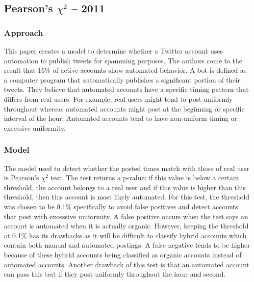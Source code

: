 \documentclass[11pt, oneside]{article}   	%
\begin{document}
\subsection*{Pearson's $\chi^2$ -- 2011}

\subsubsection*{Approach}

\quad This paper creates a model to determine whether a Twitter account uses automation to publish tweets for spamming purposes. 
The authors come to the result that 16\% of active accounts show automated behavior.
A bot is defined as a computer program that automatically publishes a significant portion of their tweets.
They believe that automated accounts have a specific timing pattern that differs from real users.
For example, real users might tend to post uniformly throughout whereas automated accounts might post at the beginning or specific interval of the hour.
Automated accounts tend to have non-uniform timing or excessive uniformity.

\subsubsection*{Model}

\quad The model used to detect whether the posted times match with those of real user is Pearson's $\chi^2$ test.
The test returns a p-value; if this value is below a certain threshold, the account belongs to a real user and if this value is higher than this threshold, then this account is most likely automated.
For this test, the threshold was chosen to be 0.1\% specifically to avoid false positives and detect accounts that post with excessive uniformity.
A false positive occurs when the test says an account is automated when it is actually organic.
However, keeping the threshold at 0.1\% has its drawbacks as it will be difficult to classify hybrid accounts which contain both manual and automated postings.
A false negative tends to be higher because of these hybrid accounts being classified as organic accounts instead of automated accounts.
Another drawback of this test is that an automated account can pass this test if they post uniformly throughout the hour and second.
 
\end{document}
